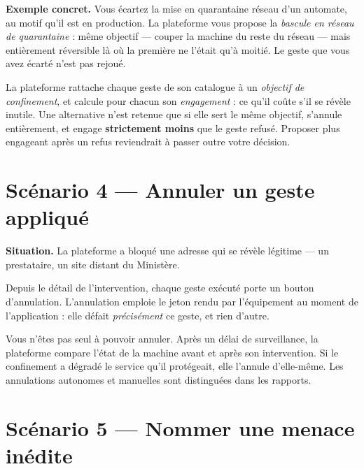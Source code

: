 \textbf{Exemple concret.} Vous écartez la mise en quarantaine réseau d'un
automate, au motif qu'il est en production. La plateforme vous propose la
\emph{bascule en réseau de quarantaine} : même objectif — couper la machine du
reste du réseau — mais entièrement réversible là où la première ne l'était
qu'à moitié. Le geste que vous avez écarté n'est pas rejoué.

\begin{tcolorbox}[colback=green!4!white, colframe=darkgreen,
  title=\textbf{Bon à savoir --- d'où vient la proposition},
  fonttitle=\bfseries, boxrule=0.6pt]
La plateforme rattache chaque geste de son catalogue à un \emph{objectif de
confinement}, et calcule pour chacun son \emph{engagement} : ce qu'il coûte
s'il se révèle inutile. Une alternative n'est retenue que si elle sert le même
objectif, s'annule entièrement, et engage \textbf{strictement moins} que le
geste refusé. Proposer plus engageant après un refus reviendrait à passer
outre votre décision.
\end{tcolorbox}

\section{Scénario 4 --- Annuler un geste appliqué}

\textbf{Situation.} La plateforme a bloqué une adresse qui se révèle
légitime — un prestataire, un site distant du Ministère.

Depuis le détail de l'intervention, chaque geste exécuté porte un bouton
d'annulation. L'annulation emploie le jeton rendu par l'équipement au moment
de l'application : elle défait \emph{précisément} ce geste, et rien d'autre.

\begin{tcolorbox}[colback=green!4!white, colframe=darkgreen,
  title=\textbf{Bon à savoir}, fonttitle=\bfseries, boxrule=0.6pt]
Vous n'êtes pas seul à pouvoir annuler. Après un délai de surveillance, la
plateforme compare l'état de la machine avant et après son intervention. Si le
confinement a dégradé le service qu'il protégeait, elle l'annule d'elle-même.
Les annulations autonomes et manuelles sont distinguées dans les rapports.
\end{tcolorbox}

\section{Scénario 5 --- Nommer une menace inédite}

